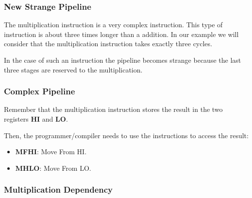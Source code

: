 
\begin{frame}
  \frametitle{New Strange Pipeline}

  The multiplication instruction is a very complex instruction. This type
  of instruction is about three times longer than a addition. In our example
  we will consider that the multiplication instruction takes exactly three
  cycles.

  \-

  In the case of such an instruction the pipeline becomes strange because
  the last three stages are reserved to the multiplication.
\end{frame}


\begin{frame}
  \frametitle{Complex Pipeline}

  Remember that the multiplication instruction stores the result in the
  two registers \textbf{HI} and \textbf{LO}.

  \-

  Then, the programmer/compiler needs to use the instructions to access
  the result:

  \begin{itemize}
    \item
      \textbf{MFHI}: Move From HI.
    \item
      \textbf{MHLO}: Move From LO.
  \end{itemize}

  \begin{center}
  \end{center}
\end{frame}


\begin{frame}
  \frametitle{Multiplication Dependency}

  \begin{center}
  \end{center}
\end{frame}


